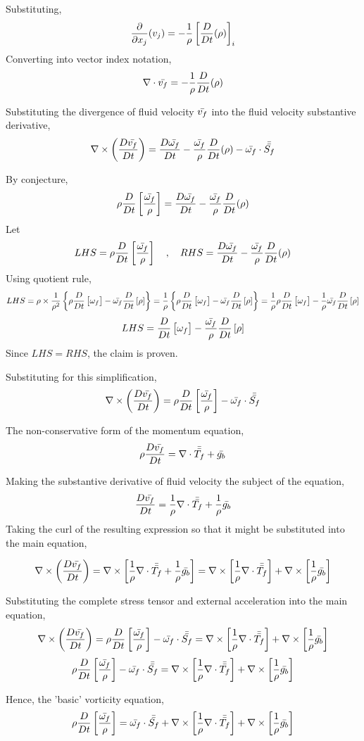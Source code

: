 \documentclass[class=report, 12pt, crop=false]{standalone}
\begin{document}
\begin{center}
Substituting,
$$\frac{\partial}{\partial x_j}(v_j) = -\frac{1}{\rho}\left[\frac{D }{Dt}(\rho)\right]_i$$
Converting into vector index notation,
$$\nabla\cdot\bar{v_f} = -\frac{1}{\rho}\frac{D }{Dt}(\rho)$$

Substituting the divergence of fluid velocity $\bar{v_f}$ into the fluid velocity substantive derivative,
$$\nabla\times\left(\frac{D \bar{v_f}}{Dt}\right) = \frac{D \bar{\omega_f}}{Dt} - \frac{\bar{\omega_f}}{\rho}\frac{D }{Dt}(\rho) - \bar{\omega_f} \cdot \bar{\bar{S_f}}$$

By conjecture,
$$\rho\frac{D}{Dt}\left[\frac{\bar{\omega_f}}{\rho}\right] = \frac{D \bar{\omega_f}}{Dt} - \frac{\bar{\omega_f}}{\rho}\frac{D }{Dt}(\rho)$$
Let
$$LHS = \rho\frac{D}{Dt}\left[\frac{\bar{\omega_f}}{\rho}\right] \quad,\quad RHS = \frac{D \bar{\omega_f}}{Dt} - \frac{\bar{\omega_f}}{\rho}\frac{D }{Dt}(\rho)$$
Using quotient rule,
$$LHS = \rho\times\frac{1}{\rho^2}\left\{\rho\frac{D}{Dt}\left[\omega_f\right] - \bar{\omega_f}\frac{D}{Dt}\left[\rho\right]\right\} = \frac{1}{\rho}\left\{\rho\frac{D}{Dt}\left[\omega_f\right] - \bar{\omega_f}\frac{D}{Dt}\left[\rho\right]\right\} = \frac{1}{\rho}\rho\frac{D}{Dt}\left[\omega_f\right] - \frac{1}{\rho}\bar{\omega_f}\frac{D}{Dt}\left[\rho\right]$$
$$LHS = \frac{D}{Dt}\left[\omega_f\right] - \frac{\bar{\omega_f}}{\rho}\frac{D}{Dt}\left[\rho\right]$$
Since $LHS = RHS$, the claim is proven. 

Substituting for this simplification,
$$\nabla\times\left(\frac{D \bar{v_f}}{Dt}\right) = \rho\frac{D}{Dt}\left[\frac{\bar{\omega_f}}{\rho}\right] - \bar{\omega_f} \cdot \bar{\bar{S_f}}$$

The non-conservative form of the momentum equation,
$$\rho \frac{D\bar{v_f}}{Dt} = \nabla\cdot\bar{\bar{T_f}} + \bar{g_b}$$

Making the substantive derivative of fluid velocity the subject of the equation,
$$\frac{D\bar{v_f}}{Dt} = \frac{1}{\rho}\nabla\cdot\bar{\bar{T_f}} + \frac{1}{\rho}\bar{g_b}$$
Taking the curl of the resulting expression so that it might be substituted into the main equation,

$$\nabla\times \left(\frac{D\bar{v_f}}{Dt}\right) = \nabla\times\left[\frac{1}{\rho}\nabla\cdot\bar{\bar{T_f}} + \frac{1}{\rho}\bar{g_b}\right] = \nabla\times\left[\frac{1}{\rho}\nabla\cdot\bar{\bar{T_f}}\right] + \nabla\times\left[\frac{1}{\rho}\bar{g_b}\right]$$

Substituting the complete stress tensor and external acceleration into the main equation,
$$\nabla\times\left(\frac{D \bar{v_f}}{Dt}\right) = \rho\frac{D}{Dt}\left[\frac{\bar{\omega_f}}{\rho}\right] - \bar{\omega_f} \cdot \bar{\bar{S_f}} = \nabla\times\left[\frac{1}{\rho}\nabla\cdot\bar{\bar{T_f}}\right] + \nabla\times\left[\frac{1}{\rho}\bar{g_b}\right]$$
$$\rho\frac{D}{Dt}\left[\frac{\bar{\omega_f}}{\rho}\right] - \bar{\omega_f} \cdot \bar{\bar{S_f}} = \nabla\times\left[\frac{1}{\rho}\nabla\cdot\bar{\bar{T_f}}\right] + \nabla\times\left[\frac{1}{\rho}\bar{g_b}\right]$$

Hence, the 'basic' vorticity equation,
$$\rho\frac{D}{Dt}\left[\frac{\bar{\omega_f}}{\rho}\right] = \bar{\omega_f} \cdot \bar{\bar{S_f}} + \nabla\times\left[\frac{1}{\rho}\nabla\cdot\bar{\bar{T_f}}\right] + \nabla\times\left[\frac{1}{\rho}\bar{g_b}\right]$$



\end{center}
\end{document}
